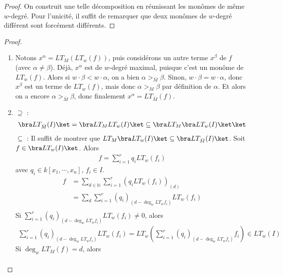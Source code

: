         \begin{proof}
            On construit une telle décomposition en réunissant les monômes de même $w$-degré. Pour l'unicité, il suffit de remarquer que deux monômes de $w$-degré différent sont forcément différents.
        \end{proof}
        \begin{proof}
            \begin{enumerate}
                \item Notons $x^\alpha = LT_M(LT_w(f))$, puis considérons un autre terme $x^\beta$ de $f$ (avec $\alpha \neq \beta$). Déjà, $x^\alpha$ est de $w$-degré maximal, puisque c'est un monôme de $LT_w(f)$. Alors si $w \cdot \beta < w \cdot \alpha$, on a bien $\alpha >_{\bar M} \beta$. Sinon, $w \cdot \beta = w \cdot \alpha$, donc $x^\beta$ est un terme de $LT_w(f)$, mais donc $\alpha >_M \beta$ par définition de $\alpha$. Et alors on a encore $\alpha >_{\bar M} \beta$, donc finalement $x^\alpha = LT_{\bar M}(f)$.
                \item $\supseteq$ : 
                \begin{align*}
                    \bra LT_{\bar M}(I) \ket = \bra LT_M LT_w(I) \ket \subseteq \bra LT_M \bra LT_w(I) \ket \ket 
                \end{align*}
                $\subseteq$ : Il suffit de montrer que $LT_M \bra LT_w(I) \ket \subseteq \bra LT_{\bar M}(I) \ket$. Soit $f \in \bra LT_w(I) \ket$. Alors 
                \begin{align*}
                    f = \sum_{i = 1}^r q_i LT_w(f_i)
                \end{align*}
                avec $q_i \in k[x_1, \cdots, x_n]$, $f_i \in I$.
                \begin{align*}
                    f &= \sum_{d \in \mathbb{N}} \sum_{i = 1}^r (q_i LT_w(f_i))_{(d)} \\
                    &= \sum_d \sum_{i = 1}^r (q_i)_{(d - \deg_w LT_w f_i)} LT_w(f_i) \\
                \end{align*}
                Si $\sum_{i = 1}^r (q_i)_{(d - \deg_w LT_w f_i)} LT_w(f_i) \neq 0$, alors
                \begin{align*}
                    \sum_{i = 1}^r (q_i)_{(d - \deg_w LT_w f_i)} LT_w(f_i) = LT_w \left( \sum_{i = 1}^r (q_i)_{(d - \deg_w LT_w f_i)} f_i \right) \in LT_w(I) 
                \end{align*}
                Si $\deg_w LT_M(f) = d$, alors
                \begin{align*}

\end{align*}
\end{enumerate}
\end{proof}
